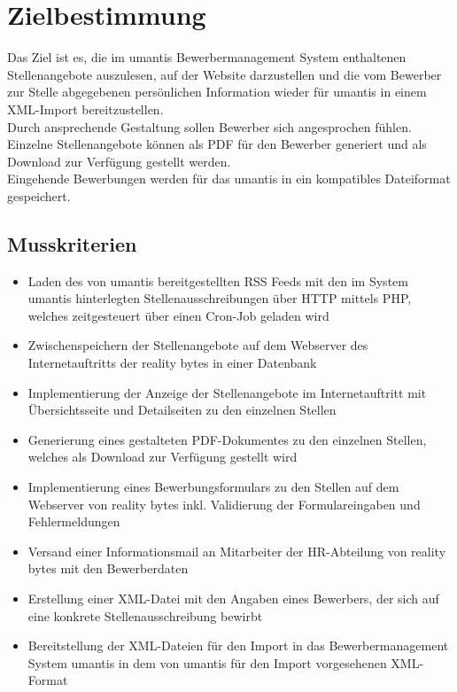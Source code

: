\section{Zielbestimmung}

    Das Ziel ist es, die im umantis Bewerbermanagement System enthaltenen Stellenangebote auszulesen, auf der Website darzustellen und die vom Bewerber zur Stelle abgegebenen persönlichen Information wieder für umantis in einem XML-Import bereitzustellen. \\
    Durch ansprechende Gestaltung sollen Bewerber sich angesprochen fühlen. Einzelne Stellenangebote können als PDF für den Bewerber generiert und als Download zur Verfügung gestellt werden. \\
    Eingehende Bewerbungen werden für das umantis in ein kompatibles Dateiformat gespeichert.

    \subsection{Musskriterien}

        \begin{itemize}
            \item Laden des von umantis bereitgestellten \gls{RSS Feeds} mit den im System umantis hinterlegten Stellenausschreibungen über \gls{HTTP} mittels \gls{PHP}, welches zeitgesteuert über einen \gls{Cron-Job} geladen wird
            \item Zwischenspeichern der Stellenangebote auf dem Webserver des Internetauftritts der reality bytes in einer Datenbank
            \item Implementierung der Anzeige der Stellenangebote im Internetauftritt mit Übersichtsseite und Detailseiten zu den einzelnen Stellen
            \item Generierung eines gestalteten PDF-Dokumentes zu den einzelnen Stellen, welches als \gls{Download} zur Verfügung gestellt wird
            \item Implementierung eines Bewerbungsformulars zu den Stellen auf dem Webserver von reality bytes inkl. \gls{Validierung} der Formulareingaben und Fehlermeldungen
            \item Versand einer Informationsmail an Mitarbeiter der HR-Abteilung von reality bytes mit den Bewerberdaten
            \item Erstellung einer XML-Datei mit den Angaben eines Bewerbers, der sich auf eine konkrete Stellenausschreibung bewirbt
            \item Bereitstellung der XML-Dateien für den \gls{Import} in das Bewerbermanagement System umantis in dem von umantis für den Import vorgesehenen XML-Format
        \end{itemize}

